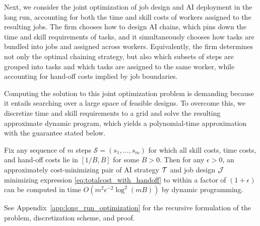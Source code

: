 Next, we consider the joint optimization of job design and AI deployment in the long run, accounting for both the time and skill costs of workers assigned to the resulting jobs. 
The firm chooses how to design AI chains, which pins down the time and skill requirements of tasks, and it simultaneously chooses how tasks are bundled into jobs and assigned across workers. 
Equivalently, the firm determines not only the optimal chaining strategy, but also which subsets of steps are grouped into tasks and which tasks are assigned to the same worker, while accounting for hand-off costs implied by job boundaries. 

Computing the solution to this joint optimization problem is demanding because it entails searching over a large space of feasible designs. 
To overcome this, we discretize time and skill requirements to a grid and solve the resulting approximate dynamic program, which yields a polynomial-time approximation with the guarantee stated below. 

\begin{proposition}
\label{prop:totalcost_optimization_dp}
Fix any sequence of $m$ steps $\mathcal{S} = (s_1, \dotsc, s_m)$ for which all skill costs, time costs, and hand-off costs lie in $[1/B, B]$ for some $B > 0$.  
Then for any $\epsilon > 0$, an approximately cost-minimizing pair of AI strategy $\mathcal{T}$ and job design $\mathcal{J}$ minimizing expression \eqref{eq:totalcost_with_handoff} to within a factor of $(1+\epsilon)$ can be computed in time $O(m^2 \epsilon^{-2} \log^2(mB) )$ by dynamic programming. 
\end{proposition}
See Appendix~\ref{app:long_run_optimization} for the recursive formulation of the problem, discretization scheme, and proof.